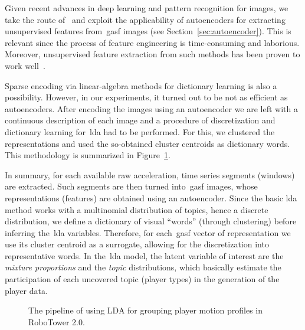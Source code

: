 Given recent advances in deep learning and pattern recognition for images, we take the route of~\citep{wang_encoding_2015} and exploit the applicability of autoencoders for extracting unsupervised features from~\gls{gasf} images (see Section~\ref{sec:autoencoder}). This is relevant since the process of feature engineering is time-consuming and laborious. Moreover, unsupervised feature extraction from such methods has been proven to work well~\citep{wang_imaging_2015, wang_time_2016}.

Sparse encoding via linear-algebra methods for dictionary learning is also a possibility. However, in our experiments, it turned out to be not as efficient as autoencoders. After encoding the images using an autoencoder we are left with a continuous description of each image and a procedure of discretization and dictionary learning for~\gls{lda} had to be performed. For this, we clustered the representations and used the so-obtained cluster centroids as dictionary words. This methodology is summarized in Figure~\ref{diagram:methodology}.

In summary, for each available raw acceleration, time series segments (windows) are extracted. Such segments are then turned into~\gls{gasf} images, whose representations (features) are obtained using an autoencoder. Since the basic \gls{lda} method works with a multinomial distribution of topics, hence a discrete distribution, we define a dictionary of visual ``words'' (through clustering) before inferring the~\gls{lda} variables. Therefore, for each~\gls{gasf} vector of representation we use its cluster centroid as a surrogate, allowing for the discretization into representative words. In the~\gls{lda} model, the latent variable of interest are the \textit{mixture proportions} and the \textit{topic} distributions, which basically estimate the participation of each uncovered topic (player types) in the generation of the player data.

\begin{figure}[h]
	\centering
    \caption{The pipeline of using LDA for grouping player motion profiles in RoboTower 2.0.}
    \label{diagram:methodology}
\end{figure}

